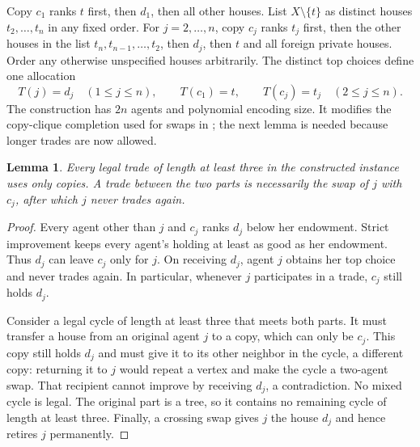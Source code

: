 \documentclass[11pt]{article}
\newtheorem{lemma}{Lemma}
\begin{document}
Copy $c_1$ ranks $t$ first, then $d_1$, then all other houses. List
$X\setminus\{t\}$ as distinct houses $t_2,\ldots,t_n$ in any fixed
order. For $j=2,\ldots,n$, copy $c_j$ ranks $t_j$ first, then the other
houses in the list $t_n,t_{n-1},\ldots,t_2$, then $d_j$, then $t$ and
all foreign private houses. Order any otherwise unspecified houses arbitrarily.
The distinct top choices define one allocation
\[
 T(j)=d_j\quad(1\leq j\leq n),\qquad
 T(c_1)=t,\qquad T(c_j)=t_j\quad(2\leq j\leq n).
\]
The construction has $2n$ agents and polynomial encoding size. It
modifies the copy-clique completion used for swaps in
\cite[Theorem 2]{swaps}; the next lemma is needed because longer trades
are now allowed.

\begin{lemma}\label{cut}
Every legal trade of length at least three in the constructed instance
uses only copies. A trade between the two parts is necessarily the swap
of $j$ with $c_j$, after which $j$ never trades again.
\end{lemma}
\begin{proof}
Every agent other than $j$ and $c_j$ ranks $d_j$ below her endowment. Strict improvement keeps every agent's holding
at least as good as her endowment. Thus $d_j$ can leave $c_j$ only for
$j$. On receiving $d_j$, agent $j$ obtains her top choice and never
trades again. In particular, whenever $j$ participates in a trade,
$c_j$ still holds $d_j$.

Consider a legal cycle of length at least three that meets both parts.
It must transfer a house from an original agent $j$ to a copy, which
can only be $c_j$. This copy still holds $d_j$ and must give it to
its other neighbor in the cycle, a different copy: returning it to $j$
would repeat a vertex and make the cycle a two-agent swap. That recipient
cannot improve by receiving $d_j$, a contradiction. No mixed cycle is
legal. The original part is a tree, so it contains no remaining cycle
of length at least three. Finally, a crossing swap gives $j$ the house
$d_j$ and hence retires $j$ permanently.
\end{proof}
\end{document}
